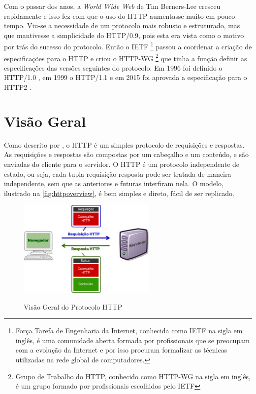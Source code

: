 Com o passar dos anos, a \textit{World Wide Web} de Tim Berners-Lee cresceu rapidamente e isso fez com que o uso do HTTP aumentasse muito em pouco tempo. Viu-se a necessidade de um protocolo mais robusto e estruturado, mas que mantivesse a simplicidade do HTTP/0.9, pois esta era vista como o motivo por trás do sucesso do protocolo. Então o IETF \footnote{Força Tarefa de Engenharia da Internet, conhecida como IETF na sigla em inglês, é uma comunidade aberta formada por profissionais que se preocupam com a evolução da Internet e por isso procuram formalizar as técnicas utilizadas na rede global de computadores.} passou a coordenar a criação de especificações para o HTTP e criou o HTTP-WG \footnote{Grupo de Trabalho do HTTP, conhecido como HTTP-WG na sigla em inglês, é um grupo formado por profissionais escolhidos pelo IETF} que tinha a função definir as especificações das versões seguintes do protocolo. Em 1996 foi definido o HTTP/1.0 \cite{RFC1945}, em 1999 o HTTP/1.1 \cite{RFC2616} e em 2015 foi aprovada a especificação para o HTTP2 \cite{HTTP2Spec}.

\section{Visão Geral}
\label{sec:http_visão_geral}

Como descrito por , o HTTP é um simples protocolo de requisições e respostas. As requisições e respostas são compostas por um cabeçalho e um conteúdo, e são enviadas do cliente para o servidor. O HTTP é um protocolo independente de estado, ou seja, cada tupla requisição-resposta pode ser tratada de maneira independente, sem que as anteriores e futuras interfiram nela. O modelo, ilustrado na \autoref{fig:httpoverview}, é bem simples e direto, fácil de ser replicado.

\begin{figure}[!htb]
    \centering
    \caption{Visão Geral do Protocolo HTTP}
    \includegraphics[width=0.6\textwidth]{./04-figuras/fund-teorica/http_overview}
    \label{fig:httpoverview}
\end{figure}

